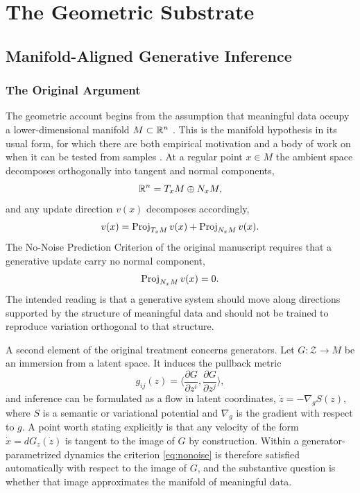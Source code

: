 \part{The Geometric Substrate}
\label{part:geometry}

\chapter{Manifold-Aligned Generative Inference}
\label{ch:magi}

\section{The Original Argument}

The geometric account begins from the assumption that meaningful data occupy a lower-dimensional manifold $M\subset\mathbb{R}^n$ \cite{flyxion2025}. This is the manifold hypothesis in its usual form, for which there are both empirical motivation and a body of work on when it can be tested from samples \cite{fefferman2016}. At a regular point $x\in M$ the ambient space decomposes orthogonally into tangent and normal components,
\[
\mathbb{R}^n=T_xM\oplus N_xM,
\]
and any update direction $v(x)$ decomposes accordingly,
\[
v(x)=\operatorname{Proj}_{T_xM}v(x)+\operatorname{Proj}_{N_xM}v(x).
\]
The No-Noise Prediction Criterion of the original manuscript requires that a generative update carry no normal component,
\begin{equation}\label{eq:nonoise}
\operatorname{Proj}_{N_xM}v(x)=0.
\end{equation}
The intended reading is that a generative system should move along directions supported by the structure of meaningful data and should not be trained to reproduce variation orthogonal to that structure.

A second element of the original treatment concerns generators. Let $G:\mathcal Z\to M$ be an immersion from a latent space. It induces the pullback metric
\[
g_{ij}(z)=\Big\langle \frac{\partial G}{\partial z^i},\frac{\partial G}{\partial z^j}\Big\rangle,
\]
and inference can be formulated as a flow in latent coordinates, $\dot z=-\nabla_g S(z)$, where $S$ is a semantic or variational potential and $\nabla_g$ is the gradient with respect to $g$. A point worth stating explicitly is that any velocity of the form $\dot x=dG_z(\dot z)$ is tangent to the image of $G$ by construction. Within a generator-parametrized dynamics the criterion \eqref{eq:nonoise} is therefore satisfied automatically with respect to the image of $G$, and the substantive question is whether that image approximates the manifold of meaningful data.

